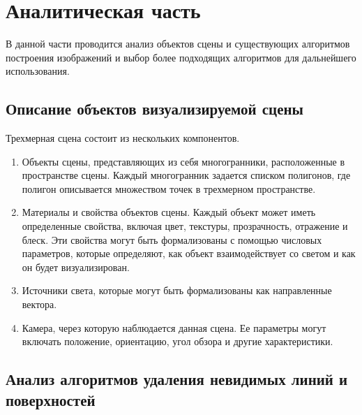 \chapter{Аналитическая часть}

В данной части проводится анализ объектов сцены и существующих алгоритмов построения изображений и выбор более подходящих алгоритмов для дальнейшего использования.

\section{Описание объектов визуализируемой сцены}

Трехмерная сцена состоит из нескольких компонентов.
\begin{enumerate}
    \item Объекты сцены, представляющих из себя многогранники, расположенные в пространстве сцены. 
    Каждый многогранник задается списком полигонов, где полигон описывается множеством точек в трехмерном пространстве.
    \item Материалы и свойства объектов сцены. 
    Каждый объект может иметь определенные свойства, включая цвет, текстуры, прозрачность, отражение и блеск. 
    Эти свойства могут быть формализованы с помощью числовых параметров, которые определяют, как объект взаимодействует со светом и как он будет визуализирован. 
    \item Источники света, которые могут быть формализованы как направленные вектора.
    \item Камера, через которую наблюдается данная сцена. 
    Ее параметры могут включать положение, ориентацию, угол обзора и другие характеристики.
\end{enumerate}

\section{Анализ алгоритмов удаления невидимых линий и поверхностей}

